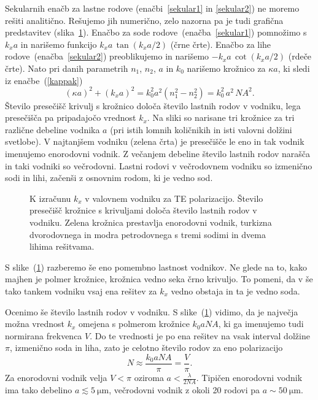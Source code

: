 Sekularnih enačb za lastne rodove (enačbi~\ref{sekular1} in \ref{sekular2}) ne moremo rešiti 
analitično. Rešujemo jih numerično, zelo nazorna pa je tudi grafična predstavitev
(slika~\ref{fig:TEsec}). Enačbo za sode rodove~(enačba~\ref{sekular1}) pomnožimo s 
$k_xa$ in narišemo funkcijo $k_xa\, \tan (k_xa/2)$ (črne črte). Enačbo za lihe 
rodove~(enačba~\ref{sekular2}) preoblikujemo in narišemo $-k_xa\, \cot (k_xa/2)$ (rdeče črte).
Nato pri danih parametrih $n_1$, $n_2$, $a$ in $k_0$ narišemo krožnico za $\kappa a$, 
ki sledi iz enačbe~(\ref{kappak})
\begin{equation}
 (\kappa a)^2+ (k_x a)^{2}=k_{0}^{2} a^2\left(n_{1}^{2}-n_{2}^{2}\right) = k_0^2\,a^2\,NA^2.
\end{equation}
Število presečišč krivulj s krožnico določa število lastnih rodov v vodniku, lega presečišča
pa pripadajočo vrednost $k_x$. Na sliki so narisane tri krožnice za 
tri različne debeline vodnika $a$ (pri istih lomnih količnikih in isti valovni 
dolžini svetlobe). V najtanjšem vodniku (zelena črta) je presečišče
le eno in tak vodnik imenujemo enorodovni vodnik. 
Z večanjem debeline število lastnih rodov narašča in taki vodniki so 
večrodovni. Lastni rodovi v večrodovnem vodniku
so izmenično sodi in lihi, začenši z osnovnim rodom, ki je vedno sod. 
\begin{figure}[h]
\centering
\def\svgwidth{70truemm} 

\caption{K izračunu $k_x$ v valovnem vodniku
za TE polarizacijo. Število presečišč krožnice s krivuljami določa število lastnih rodov 
v vodniku. Zelena krožnica prestavlja enorodovni vodnik, turkizna dvorodovnega in modra
petrodovnega s tremi sodimi in dvema lihima rešitvama.}
\label{fig:TEsec}
\end{figure}

S slike~(\ref{fig:TEsec}) razberemo še eno pomembno lastnost vodnikov. 
Ne glede na to, kako majhen je polmer krožnice, krožnica vedno seka črno krivuljo. 
To pomeni, da v še tako tankem vodniku vsaj ena rešitev za $k_x$ vedno obstaja
in ta je vedno soda. 

Ocenimo še število lastnih rodov v vodniku. S slike~(\ref{fig:TEsec}) vidimo, da je 
največja možna vrednost $k_x$ omejena s polmerom krožnice $k_0aNA$, ki ga imenujemo
tudi normirana frekvenca $V$. Do te vrednosti je 
po ena rešitev na vsak interval dolžine $\pi$, izmenično soda in liha, 
zato je celotno število rodov za eno polarizacijo
\begin{equation}
N \approx \frac{k_0 a NA}{\pi} = \frac{V}{\pi}.
\end{equation}
Za enorodovni vodnik velja $V < \pi$ oziroma $a< \frac{\lambda}{2 NA}$.
Tipičen enorodovni vodnik ima tako debelino $a\lesssim 5~\si{\micro\meter}$, 
večrodovni vodnik z okoli 20 rodovi pa $a\sim 50~\si{\micro\meter}$.

